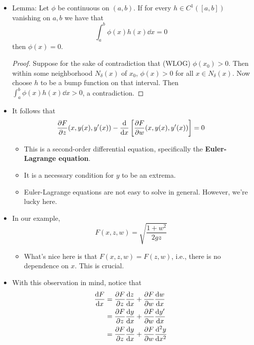 \documentclass[../notes.tex]{subfiles}
\begin{document}
\begin{itemize}
\begin{itemize}
\begin{itemize}
        \end{itemize}
        \item Lemma: Let $\phi$ be continuous on $(a,b)$. If for every $h\in C^1([a,b])$ vanishing on $a,b$ we have that
        \begin{equation*}
            \int_a^b\phi(x)h(x)\dd{x} = 0
        \end{equation*}
        then $\phi(x)=0$.
        \begin{proof}
            Suppose for the sake of contradiction that (WLOG) $\phi(x_0)>0$. Then within some neighborhood $N_\delta(x)$ of $x_0$, $\phi(x)>0$ for all $x\in N_\delta(x)$. Now choose $h$ to be a bump function on that interval. Then $\int_a^b\phi(x)h(x)\dd{x}>0$, a contradiction.
        \end{proof}
        \item It follows that
        \begin{equation*}
            {\pdv{F}{z}}(x,y(x),y'(x))-\dv{x}\left[ {\pdv{F}{w}}(x,y(x),y'(x)) \right] = 0
        \end{equation*}
        \begin{itemize}
            \item This is a second-order differential equation, specifically the \textbf{Euler-Lagrange equation}.
            \item It is a necessary condition for $y$ to be an extrema.
            \item Euler-Lagrange equations are not easy to solve in general. However, we're lucky here.
        \end{itemize}
        \item In our example,
        \begin{equation*}
            F(x,z,w) = \sqrt{\frac{1+w^2}{2gz}}
        \end{equation*}
        \begin{itemize}
            \item What's nice here is that $F(x,z,w)=F(z,w)$, i.e., there is no dependence on $x$. This is crucial.
        \end{itemize}
        \item With this observation in mind, notice that
        \begin{align*}
            \dv{F}{x} &= \pdv{F}{z}\dv{z}{x}+\pdv{F}{w}\dv{w}{x}\\
            &= \pdv{F}{z}\dv{y}{x}+\pdv{F}{w}\dv{y'}{x}\\
            &= \pdv{F}{z}\dv{y}{x}+\pdv{F}{w}\dv[2]{y}{x}

\end{align*}
\end{itemize}
\end{itemize}
\end{document}
